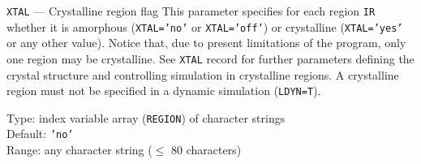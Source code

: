 \begin{keydescription}{\texttt{XTAL} --- Crystalline region flag}
%
  This parameter specifies for each region \texttt{IR} whether it is amorphous
  (\texttt{XTAL='no'} or \texttt{XTAL='off'}) or crystalline
  (\texttt{XTAL='yes'} or any other value).  Notice that, due to present
  limitations of the program, only one region may be crystalline. See
  \texttt{XTAL} record for further parameters defining the crystal
  structure and controlling simulation in crystalline regions. A crystalline
  region must not be specified in a dynamic simulation (\texttt{LDYN=T}).
%
  \begin{keytab}
    Type:    \> index variable array (\texttt{REGION}) of character strings \\
    Default: \> \texttt{'no'} \\
    Range:   \> any character string ($\le$ 80 characters)
  \end{keytab}
\end{keydescription}








